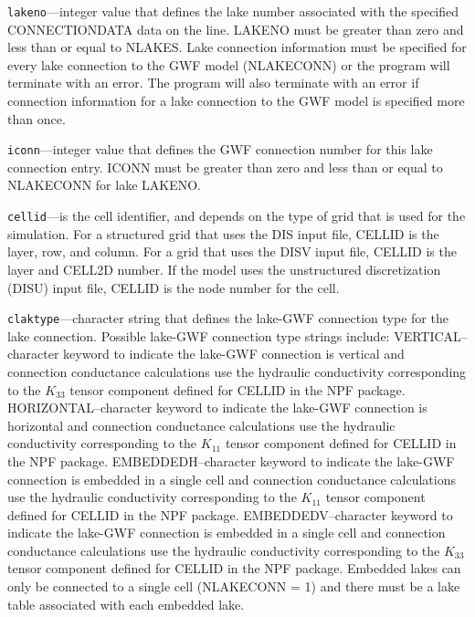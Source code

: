 \begin{description}
\item \texttt{lakeno}---integer value that defines the lake number associated with the specified CONNECTIONDATA data on the line. LAKENO must be greater than zero and less than or equal to NLAKES. Lake connection information must be specified for every lake connection to the GWF model (NLAKECONN) or the program will terminate with an error.  The program will also terminate with an error if connection information for a lake connection to the GWF model is specified more than once.

\item \texttt{iconn}---integer value that defines the GWF connection number for this lake connection entry. ICONN must be greater than zero and less than or equal to NLAKECONN for lake LAKENO.

\item \texttt{cellid}---is the cell identifier, and depends on the type of grid that is used for the simulation.  For a structured grid that uses the DIS input file, CELLID is the layer, row, and column.   For a grid that uses the DISV input file, CELLID is the layer and CELL2D number.  If the model uses the unstructured discretization (DISU) input file, CELLID is the node number for the cell.

\item \texttt{claktype}---character string that defines the lake-GWF connection type for the lake connection. Possible lake-GWF connection type strings include:  VERTICAL--character keyword to indicate the lake-GWF connection is vertical  and connection conductance calculations use the hydraulic conductivity corresponding to the $K_{33}$ tensor component defined for CELLID in the NPF package. HORIZONTAL--character keyword to indicate the lake-GWF connection is horizontal and connection conductance calculations use the hydraulic conductivity corresponding to the $K_{11}$ tensor component defined for CELLID in the NPF package. EMBEDDEDH--character keyword to indicate the lake-GWF connection is embedded in a single cell and connection conductance calculations use the hydraulic conductivity corresponding to the $K_{11}$ tensor component defined for CELLID in the NPF package. EMBEDDEDV--character keyword to indicate the lake-GWF connection is embedded in a single cell and connection conductance calculations use the hydraulic conductivity corresponding to the $K_{33}$ tensor component defined for CELLID in the NPF package. Embedded lakes can only be connected to a single cell (NLAKECONN = 1) and there must be a lake table associated with each embedded lake.


\end{description}
